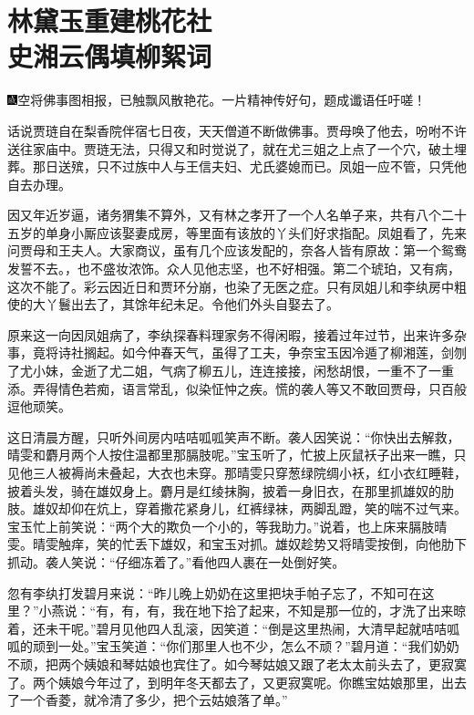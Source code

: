
\chapter{林黛玉重建桃花社\\史湘云偶填柳絮词}

{\includegraphics[width=3mm]{../Images/00005}\kaishu 空将佛事图相报，已触飘风散艳花。一片精神传好句，题成谶语任吁嗟！}

话说贾琏自在梨香院伴宿七日夜，天天僧道不断做佛事。贾母唤了他去，吩咐不许送往家庙中。贾琏无法，只得又和时觉说了，就在尤三姐之上点了一个穴，破土埋葬。那日送殡，只不过族中人与王信夫妇、尤氏婆媳而已。凤姐一应不管，只凭他自去办理。

因又年近岁逼，诸务猬集不算外，又有林之孝开了一个人名单子来，共有八个二十五岁的单身小厮应该娶妻成房，等里面有该放的丫头们好求指配。凤姐看了，先来问贾母和王夫人。大家商议，虽有几个应该发配的，奈各人皆有原故：第一个鸳鸯发誓不去。，也不盛妆浓饰。众人见他志坚，也不好相强。第二个琥珀，又有病，这次不能了。彩云因近日和贾环分崩，也染了无医之症。只有凤姐儿和李纨房中粗使的大丫鬟出去了，其馀年纪未足。令他们外头自娶去了。

原来这一向因凤姐病了，李纨探春料理家务不得闲暇，接着过年过节，出来许多杂事，竟将诗社搁起。如今仲春天气，虽得了工夫，争奈宝玉因冷遁了柳湘莲，剑刎了尤小妹，金逝了尤二姐，气病了柳五儿，连连接接，闲愁胡恨，一重不了一重添。弄得情色若痴，语言常乱，似染怔忡之疾。慌的袭人等又不敢回贾母，只百般逗他顽笑。

这日清晨方醒，只听外间房内咭咭呱呱笑声不断。袭人因笑说：``你快出去解救，晴雯和麝月两个人按住温都里那膈肢呢。''宝玉听了，忙披上灰鼠袄子出来一瞧，只见他三人被褥尚未叠起，大衣也未穿。那晴雯只穿葱绿院绸小袄，红小衣红睡鞋，披着头发，骑在雄奴身上。麝月是红绫抹胸，披着一身旧衣，在那里抓雄奴的肋肢。雄奴却仰在炕上，穿着撒花紧身儿，红裤绿袜，两脚乱蹬，笑的喘不过气来。宝玉忙上前笑说：``两个大的欺负一个小的，等我助力。''说着，也上床来膈肢晴雯。晴雯触痒，笑的忙丢下雄奴，和宝玉对抓。雄奴趁势又将晴雯按倒，向他肋下抓动。袭人笑说：``仔细冻着了。''看他四人裹在一处倒好笑。

忽有李纨打发碧月来说：``昨儿晚上奶奶在这里把块手帕子忘了，不知可在这里？''小燕说：``有，有，有，我在地下拾了起来，不知是那一位的，才洗了出来晾着，还未干呢。''碧月见他四人乱滚，因笑道：``倒是这里热闹，大清早起就咭咭呱呱的顽到一处。''宝玉笑道：``你们那里人也不少，怎么不顽？''碧月道：``我们奶奶不顽，把两个姨娘和琴姑娘也宾住了。如今琴姑娘又跟了老太太前头去了，更寂寞了。两个姨娘今年过了，到明年冬天都去了，又更寂寞呢。你瞧宝姑娘那里，出去了一个香菱，就冷清了多少，把个云姑娘落了单。''

